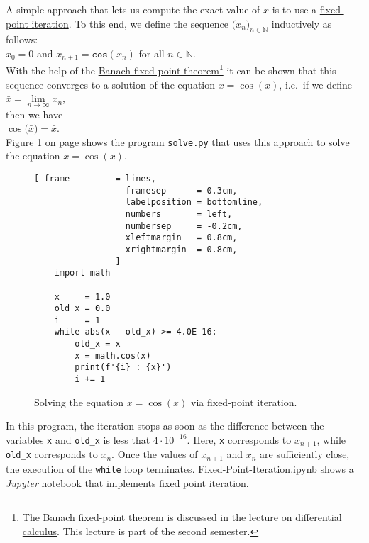 A simple approach that lets us compute the exact value of $x$ is to use a
\href{https://en.wikipedia.org/wiki/Fixed-point_iteration}{fixed-point iteration}.  To this end, we
define the sequence $\bigl(x_n\bigr)_{n\in\mathbb{N}}$ inductively as follows:
\\[0.2cm]
\hspace*{1.3cm} 
$x_0 = 0$ \quad and \quad $x_{n+1} = \mathtt{cos}(x_n)$ \quad for all $n \in \mathbb{N}$. 
\\[0.2cm]
With the help of the 
\href{https://en.wikipedia.org/wiki/Banach_fixed-point_theorem}{Banach fixed-point theorem}\footnote{
  The Banach fixed-point theorem is discussed in the lecture on
  \href{https://en.wikipedia.org/wiki/Differential_calculus}{differential calculus}.  This lecture is part of the
  second semester.
}
it can be shown that this sequence converges to a solution of the equation $x = \cos(x)$, i.e.~if we define
\\[0.2cm]
\hspace*{1.3cm}
$\bar{x} = \lim\limits_{n\rightarrow\infty} x_n$,
\\[0.2cm]
then we have
\\[0.2cm]
\hspace*{1.3cm}
$\cos\bigl(\bar{x}\bigr) = \bar{x}$.
\\[0.2cm]
Figure \ref{fig:solve.py} on page \pageref{fig:solve.py} shows the program
\href{https://github.com/karlstroetmann/Logic/blob/master/Python/solve.py}{\texttt{solve.py}}
that uses this approach to solve the equation $x = \cos(x)$.


\begin{figure}[!ht]
  \centering
\begin{Verbatim}[ frame         = lines, 
                  framesep      = 0.3cm, 
                  labelposition = bottomline,
                  numbers       = left,
                  numbersep     = -0.2cm,
                  xleftmargin   = 0.8cm,
                  xrightmargin  = 0.8cm,
                ]
    import math
    
    x     = 1.0
    old_x = 0.0
    i     = 1
    while abs(x - old_x) >= 4.0E-16:
        old_x = x
        x = math.cos(x)
        print(f'{i} : {x}')
        i += 1
\end{Verbatim} 
\vspace*{-0.3cm}
\caption{Solving the equation $x = \cos(x)$ via fixed-point iteration.}  \label{fig:solve.py}
\end{figure} %

In this program, the iteration stops as soon as the difference between the variables \texttt{x} and 
\texttt{old\_x} is less that $4 \cdot 10^{-16}$.  Here, \texttt{x} corresponds to $x_{n+1}$, while \texttt{old\_x}
corresponds to $x_n$.  Once the values of $x_{n+1}$ and $x_n$ are sufficiently close, the execution of the \texttt{while} loop
terminates.
\href{https://github.com/karlstroetmann/Logic/blob/master/Python/Fixed-Point-Iteration.ipynb}{Fixed-Point-Iteration.ipynb}
shows a \textsl{Jupyter} notebook that implements fixed point iteration.


